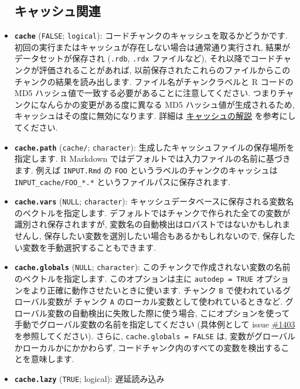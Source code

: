 \documentclass[
  lualatex,ja=standard,jafont=noto-otf]{bxjsreport}
\begin{document}
\begin{itemize}
  \hypertarget{options-cache}{%
  \subsection{キャッシュ関連}\label{options-cache}}
\item
  \textbf{\texttt{cache}} (\texttt{FALSE}; \texttt{logical}):
  コードチャンクのキャッシュを取るかどうかです.
  初回の実行またはキャッシュが存在しない場合は通常通り実行され,
  結果がデータセットが保存され (\texttt{.rdb}, \texttt{.rdx}
  ファイルなど), それ以降でコードチャンクが評価されることがあれば,
  以前保存されたこれらのファイルからこのチャンクの結果を読み出します.
  ファイル名がチャンクラベルと R コードの MD5
  ハッシュ値で一致する必要があることに注意してください.
  つまりチャンクになんらかの変更がある度に異なる MD5
  ハッシュ値が生成されるため, キャッシュはその度に無効になります. 詳細は
  \protect\hyperlink{cache}{キャッシュの解説} を参考にしてください.
\item
  \textbf{\texttt{cache.path}}
  (\texttt{\textquotesingle{}cache/\textquotesingle{}};
  \texttt{character}): 生成したキャッシュファイルの保存場所を指定します.
  R Markdown ではデフォルトでは入力ファイルの名前に基づきます. 例えば
  \texttt{INPUT.Rmd} の \texttt{FOO}
  というラベルのチャンクのキャッシュは \texttt{INPUT\_cache/FOO\_*.*}
  というファイルパスに保存されます.
\item
  \textbf{\texttt{cache.vars}} (\texttt{NULL}; \texttt{character}):
  キャッシュデータベースに保存される変数名のベクトルを指定します.
  デフォルトではチャンクで作られた全ての変数が識別され保存されますが,
  変数名の自動検出はロバストではないかもしれませんし,
  保存したい変数を選別したい場合もあるかもしれないので,
  保存したい変数を手動選択することもできます.
\item
  \textbf{\texttt{cache.globals}} (\texttt{NULL}; \texttt{character}):
  このチャンクで作成されない変数の名前のベクトルを指定します.
  このオプションは主に \texttt{autodep\ =\ TRUE}
  オプションをより正確に動作させたいときに使います. チャンク \texttt{B}
  で使われているグローバル変数が チャンク \texttt{A}
  のローカル変数として使われているときなど.
  グローバル変数の自動検出に失敗した際に使う場合,
  こにオプションを使って手動でグローバル変数の名前を指定してください
  (具体例として issue
  \href{https://github.com/yihui/knitr/issues/1403}{\#1403}
  を参照してください). さらに, \texttt{cache.globals\ =\ FALSE} は,
  変数がグローバルかローカルかにかかわらず,
  コードチャンク内のすべての変数を検出することを意味します.
\item
  \textbf{\texttt{cache.lazy}} (\texttt{TRUE}; logical): 遅延読み込み

\end{itemize}
\end{document}
